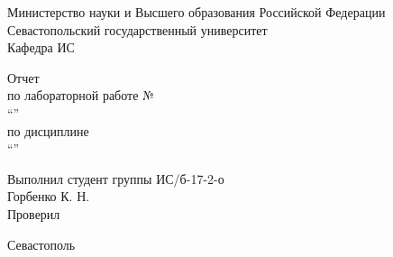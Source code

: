 \begin{titlepage}
    
    \thispagestyle{empty}
    
    \begin{center}
        
        Министерство науки и Высшего образования Российской Федерации \\
        Севастопольский государственный университет \\
        Кафедра ИС
        
        \vfill

        Отчет \\
        по лабораторной работе №\mylabnumber \\
        \enquote{\mylabtitle} \\
        по дисциплине \\
        \enquote{\MakeTextUppercase{\mysubject}}

    \end{center}

    \vspace{1cm}

    \noindent\hspace{7.5cm} Выполнил студент группы ИС/б-17-2-о \\
    \null\hspace{7.5cm} Горбенко К. Н. \\
    \null\hspace{7.5cm} Проверил \\
    \null\hspace{7.5cm} \mylecturer

    \vfill

    \begin{center}
        Севастополь \\
        \the\year{}
    \end{center}

\end{titlepage}